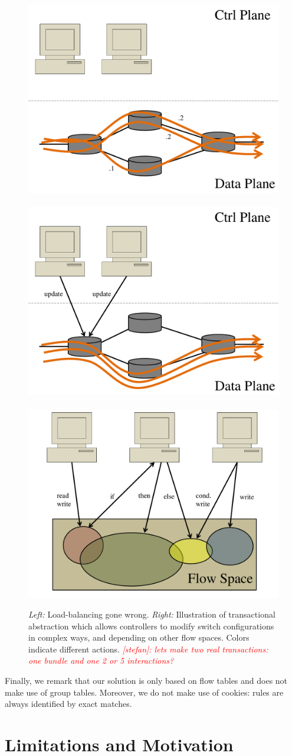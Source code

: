 \documentclass[conference]{sigcomm-alternate}
\newcommand{\stefan}[1]{\textit{\textcolor{red}{[stefan]: #1}}} %
\begin{document}
\begin{figure}[t]
\centering
\includegraphics[width=0.35\columnwidth]{loadbal-before.pdf}~\includegraphics[width=0.35\columnwidth]{loadbal.pdf}~~
\includegraphics[width=0.8\columnwidth]{pic.pdf}\\
\caption{\emph{Left:} Load-balancing gone wrong. \emph{Right:} Illustration of transactional abstraction which  allows
controllers to modify switch configurations in complex ways,
and
depending on other flow spaces. Colors indicate different actions. \stefan{lets make two real transactions: one bundle and one 2 or 5 interactions?}}\label{fig:illu}
\end{figure}

Finally, we remark that our solution is only based on flow tables
and does not make use
of group tables. 
Moreover, we do not make use of cookies: rules
are always identified by exact matches.

\section{Limitations and Motivation}\label{sec:motivation}
\end{document}
